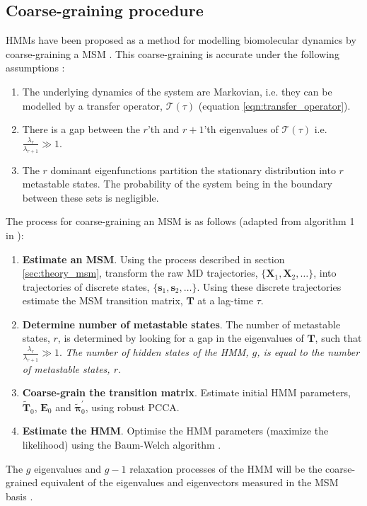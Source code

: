 \subsection{Coarse-graining procedure}
HMMs have been proposed as a method for modelling biomolecular dynamics by coarse-graining a MSM \cite{noeProjectedHiddenMarkov2013a}. This coarse-graining is accurate under the following assumptions \cite{noeProjectedHiddenMarkov2013a}:
\begin{enumerate}
    \item The underlying dynamics of the system are Markovian, i.e. they can be modelled by a transfer operator, $\mathcal{T}(\tau)$ (equation \ref{eqn:transfer_operator}). 
    \item There is a gap between the $r$'th and $r+1$'th  eigenvalues of $\mathcal{T}(\tau)$ i.e. $\frac{\lambda_{r}}{\lambda_{r+1}} \gg 1$.\label{assump_two}
    \item The $r$ dominant eigenfunctions partition the stationary distribution into $r$ metastable states. The probability of the system being in the boundary between these sets is negligible. \label{assump_three}
\end{enumerate}

The process for coarse-graining an MSM is as follows (adapted from algorithm 1 in \cite{noeProjectedHiddenMarkov2013a}): 
\begin{enumerate}
    \item \textbf{Estimate an MSM}. Using the process described in section \ref{sec:theory_msm}, transform the raw MD trajectories, $\{\mathbf{X}_{1}, \mathbf{X}_{2}, \ldots\}$, into trajectories of discrete states, $\{\mathbf{s}_{1},\mathbf{s}_{2}, \ldots\}$. Using these discrete trajectories estimate the MSM transition matrix, $\mathbf{T}$ at a lag-time $\tau$. 
    \item \textbf{Determine number of metastable states}. The number of metastable states, $r$, is determined by looking for a gap in the eigenvalues of $\mathbf{T}$, such that  $\frac{\lambda_{r}}{\lambda_{r+1}} \gg 1$. \emph{The number of hidden states of the HMM, $g$, is equal to the number of metastable states, $r$}. 
    \item \textbf{Coarse-grain the transition matrix}. Estimate initial HMM parameters, $\widetilde{\mathbf{T}}_{0}$,  $\mathbf{E}_{0}$ and $\widetilde{\bm{\pi}}^{\prime}_{0}$, using robust PCCA\cite{deuflhardRobustPerronCluster2005b}. 
    \item \textbf{Estimate the HMM}. Optimise the HMM parameters (maximize the likelihood) using the Baum-Welch algorithm \cite{baumMaximizationTechniqueOccurring1970,welch2003hidden}. 
\end{enumerate}
The $g$ eigenvalues and $g-1$ relaxation processes of the HMM will be the coarse-grained equivalent of the  eigenvalues and eigenvectors measured in the MSM basis \cite{noeProjectedHiddenMarkov2013a}. 

